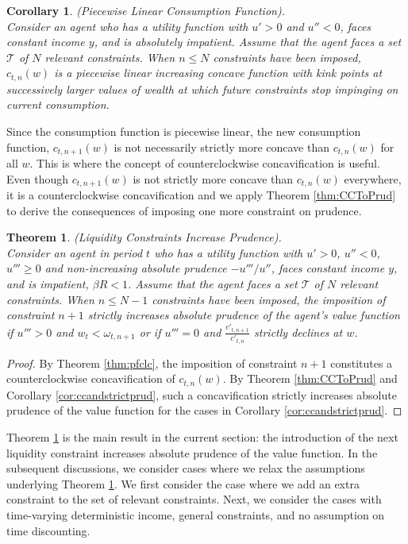 \documentclass[titlepage]{\econtex}
\providecommand{\wAlt}{\omega}
\newtheorem{theorem}{Theorem}
\newtheorem{corollary}{Corollary}
\begin{document}
\begin{corollary}(Piecewise Linear Consumption Function). \\
	Consider an agent who has a utility function with $u'> 0$ and $u'' < 0$, faces constant income ${y}$, and is absolutely impatient. Assume that the agent faces a set $\mathcal{T}$ of $N$ relevant constraints. When $n \leq N$ constraints have been imposed, $c_{t,n}(w)$ is a piecewise linear increasing concave function with kink points at successively larger values of wealth at which future constraints stop impinging on current consumption.
\end{corollary}

Since the consumption function is piecewise linear, the new consumption function, $c_{t,n+1}(w)$ is not necessarily strictly more concave than $c_{t,n}(w)$ for all $w$. This is where the concept of counterclockwise concavification is useful. Even though $c_{t,n+1}(w)$ is not strictly more concave than $c_{t,n}(w)$ everywhere, it is a counterclockwise concavification and we apply Theorem \ref{thm:CCToPrud} to derive the consequences of imposing one more constraint on prudence.

\begin{theorem}\label{thm:lcip} (Liquidity Constraints Increase Prudence). \\
	Consider an agent in period $t$ who has a utility function with $u' > 0$, $u'' < 0$, $u''' \geq 0$ and non-increasing absolute prudence $-u'''/u''$, faces constant income ${y}$, and is impatient, $\beta R < 1$. Assume that the agent faces a set $\mathcal{T}$ of $N$ relevant constraints. When $n \leq N-1$ constraints have been imposed, the imposition of constraint $n+1$ strictly increases absolute prudence of the agent's value function if $u''' > 0$ and $w_t < \wAlt_{t,n+1}$ or if $u''' = 0$ and $\frac{c'_{t,n+1}}{c'_{t,n}}$ strictly declines at $w$.
\end{theorem}
\begin{proof}
	By Theorem \ref{thm:pfclc}, the imposition of constraint $n+1$ constitutes a counterclockwise concavification of $c_{t,n}(w)$. By Theorem \ref{thm:CCToPrud} and Corollary \ref{cor:ccandstrictprud}, such a concavification strictly increases absolute prudence of the value function for the cases in Corollary \ref{cor:ccandstrictprud}.
\end{proof}

Theorem \ref{thm:lcip} is the main result in the current section: the introduction of the next liquidity constraint increases absolute prudence of the value function. In the subsequent discussions, we consider cases where we relax the assumptions underlying Theorem \ref{thm:lcip}. We first consider the case where we add an extra constraint to the set of relevant constraints. Next, we consider the cases with time-varying deterministic income, general constraints, and no assumption on time discounting.
\end{document}
